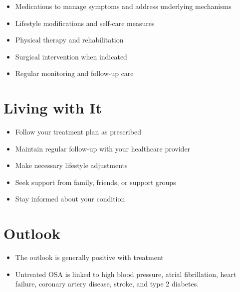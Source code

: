 \begin{itemize}[noitemsep]
  \item Medications to manage symptoms and address underlying mechanisms
  \item Lifestyle modifications and self-care measures
  \item Physical therapy and rehabilitation
  \item Surgical intervention when indicated
  \item Regular monitoring and follow-up care
\end{itemize}
\section{Living with It}
\begin{itemize}[noitemsep]
  \item Follow your treatment plan as prescribed
  \item Maintain regular follow-up with your healthcare provider
  \item Make necessary lifestyle adjustments
  \item Seek support from family, friends, or support groups
  \item Stay informed about your condition
\end{itemize}
\section{Outlook}
\begin{itemize}[noitemsep]
  \item The outlook is generally positive with treatment
  \item Untreated OSA is linked to high blood pressure, atrial fibrillation, heart failure, coronary artery disease, stroke, and type 2 diabetes.
\end{itemize}
